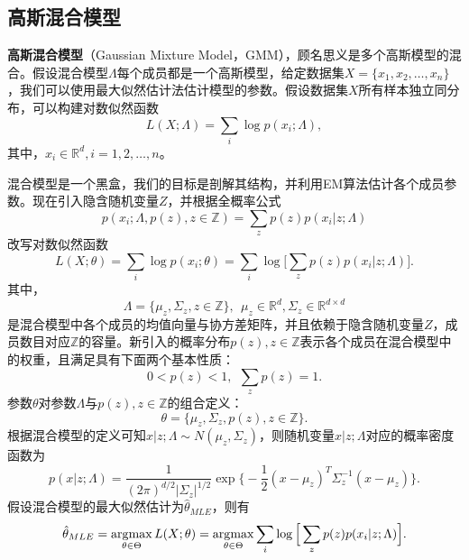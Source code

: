 \subsection{高斯混合模型}
\textbf{高斯混合模型}（Gaussian Mixture Model，GMM），顾名思义是多个高斯模型的混合。假设混合模型$\Lambda$每个成员都是一个高斯模型，给定数据集$X=\{x_1, x_2,\ldots, x_n\}$，我们可以使用最大似然估计法估计模型的参数。假设数据集$X$所有样本独立同分布，可以构建对数似然函数
\begin{equation}
    L(X; \Lambda) = \sum\limits_i \log p(x_i; \Lambda),
\end{equation}
其中，$x_i\in \mathbb R^d, i = 1, 2, \ldots, n$。

混合模型是一个黑盒，我们的目标是剖解其结构，并利用EM算法估计各个成员参数。现在引入隐含随机变量$Z$，并根据全概率公式
\begin{equation}\label{eq:totalprob}
    p(x_i; \Lambda, p(z), z\in \mathbb Z) = \sum\limits_z p(z) p(x_i|z; \Lambda)
\end{equation}
改写对数似然函数
\begin{equation}
    L(X; \theta) = \sum\limits_i \log p(x_i; \theta) = \sum\limits_i \log \Big[\sum\limits_z p(z) p(x_i|z; \Lambda)\Big].
\end{equation}
其中，
\[\Lambda = \{\mu_z, \Sigma_z, z\in \mathbb Z\}, ~~\mu_z \in \mathbb R^d, \Sigma_z\in \mathbb R^{d\times d}\]
是混合模型中各个成员的均值向量与协方差矩阵，并且依赖于隐含随机变量$Z$，成员数目对应$\mathbb Z$的容量。新引入的概率分布$p(z),z\in \mathbb Z$表示各个成员在混合模型中的权重，且满足具有下面两个基本性质：
\begin{equation}
    0 < p(z) < 1,~~\sum\limits_z p(z) = 1.
\end{equation}
参数$\theta$对参数$\Lambda$与$p(z), z\in \mathbb Z$的组合定义：
\[\theta = \{\mu_z, \Sigma_z, p(z), z\in \mathbb Z\}.\]
根据混合模型的定义可知$x|z;\Lambda \sim N(\mu_z, \Sigma_z)$，则随机变量$x|z;\Lambda$对应的概率密度函数为
\begin{equation}
    p(x|z;\Lambda) = \frac{1}{(2\pi)^{d/2} |\Sigma_z|^{1/2}} \exp \Big\{-\frac{1}{2} (x-\mu_z)^T \Sigma_z^{-1} (x-\mu_z)\Big\}.
\end{equation}
假设混合模型的最大似然估计为$\hat \theta_{MLE}$，则有
\begin{equation}
    \hat \theta_{MLE} = \operatorname*{\mathrm{\arg\!\max}}\limits_{\theta\in \Theta} L(X; \theta) = \operatorname*{\mathrm{\arg\!\max}}\limits_{\theta\in \Theta} \sum\limits_i \log \Big[\sum\limits_z p(z) p(x_i|z; \Lambda)\Big].
\end{equation}

